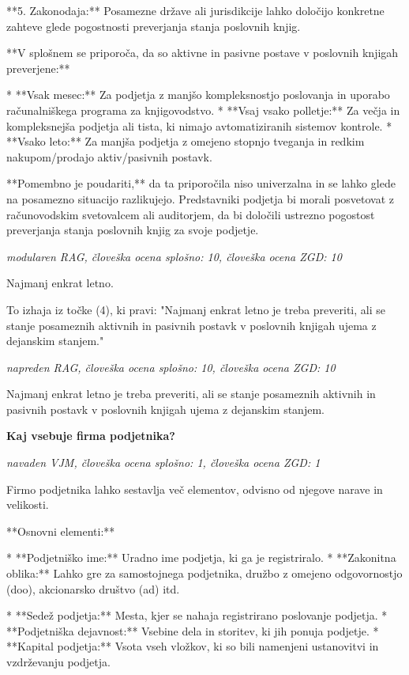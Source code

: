 \documentclass[a4paper,12pt,openright]{book}
\begin{document}
**5. Zakonodaja:** Posamezne države ali jurisdikcije lahko določijo konkretne zahteve glede pogostnosti preverjanja stanja poslovnih knjig.

**V splošnem se priporoča, da so aktivne in pasivne postave v poslovnih knjigah preverjene:**

* **Vsak mesec:** Za podjetja z manjšo kompleksnostjo poslovanja in uporabo računalniškega programa za knjigovodstvo.
* **Vsaj vsako polletje:** Za večja in kompleksnejša podjetja ali tista, ki nimajo avtomatiziranih sistemov kontrole.
* **Vsako leto:** Za manjša podjetja z omejeno stopnjo tveganja in redkim nakupom/prodajo aktiv/pasivnih postavk.

**Pomembno je poudariti,** da ta priporočila niso univerzalna in se lahko glede na posamezno situacijo razlikujejo. Predstavniki podjetja bi morali posvetovat z računovodskim svetovalcem ali auditorjem, da bi določili ustrezno pogostost preverjanja stanja poslovnih knjig za svoje podjetje.

\vspace{0.5cm}
\textit{modularen RAG, človeška ocena splošno: 10, človeška ocena ZGD: 10}

Najmanj enkrat letno. 


To izhaja iz točke (4), ki pravi: "Najmanj enkrat letno je treba preveriti, ali se stanje posameznih aktivnih in pasivnih postavk v poslovnih knjigah ujema z dejanskim stanjem."

\vspace{0.5cm}
\textit{napreden RAG, človeška ocena splošno: 10, človeška ocena ZGD: 10}

Najmanj enkrat letno je treba preveriti, ali se stanje posameznih aktivnih in pasivnih postavk v poslovnih knjigah ujema z dejanskim stanjem.

\vspace{0.5cm}
\textbf{Kaj vsebuje firma podjetnika?}

\textit{navaden VJM, človeška ocena splošno: 1, človeška ocena ZGD: 1}

Firmo podjetnika lahko sestavlja več elementov, odvisno od njegove narave in velikosti.

**Osnovni elementi:**

* **Podjetniško ime:** Uradno ime podjetja, ki ga je registriralo.
* **Zakonitna oblika:** Lahko gre za samostojnega podjetnika, družbo z omejeno odgovornostjo (doo), akcionarsko društvo (ad) itd.

* **Sedež podjetja:** Mesta, kjer se nahaja registrirano poslovanje podjetja.
* **Podjetniška dejavnost:** Vsebine dela in storitev, ki jih ponuja podjetje.
* **Kapital podjetja:**  Vsota vseh vložkov, ki so bili namenjeni ustanovitvi in vzdrževanju podjetja.
\end{document}
